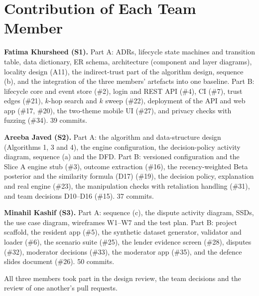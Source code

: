 \section{Contribution of Each Team Member}\label{sec:contribution-each-team-member}
\textbf{Fatima Khursheed (S1).} Part A: ADRs, lifecycle state machines and transition table, data dictionary, ER schema, architecture (component and layer diagrams), locality design (A11), the indirect-trust part of the algorithm design, sequence (b), and the integration of the three members' artefacts into one baseline. Part B: lifecycle core and event store (\#2), login and REST API (\#4), CI (\#7), trust edges (\#21), $k$-hop search and $k$ sweep (\#22), deployment of the API and web app (\#17, \#20), the two-theme mobile UI (\#27), and privacy checks with fuzzing (\#34). 39 commits.

\textbf{Areeba Javed (S2).} Part A: the algorithm and data-structure design (Algorithms 1, 3 and 4), the engine configuration, the decision-policy activity diagram, sequence (a) and the DFD. Part B: versioned configuration and the Slice A engine stub (\#3), outcome extraction (\#16), the recency-weighted Beta posterior and the similarity formula (D17) (\#19), the decision policy, explanation and real engine (\#23), the manipulation checks with retaliation handling (\#31), and team decisions D10--D16 (\#15). 37 commits.

\textbf{Minahil Kashif (S3).} Part A: sequence (c), the dispute activity diagram, SSDs, the use case diagram, wireframes W1--W7 and the test plan. Part B: project scaffold, the resident app (\#5), the synthetic dataset generator, validator and loader (\#6), the scenario suite (\#25), the lender evidence screen (\#28), disputes (\#32), moderator decisions (\#33), the moderator app (\#35), and the defence slides document (\#26). 50 commits.

All three members took part in the design review, the team decisions and the review of one another's pull requests.

